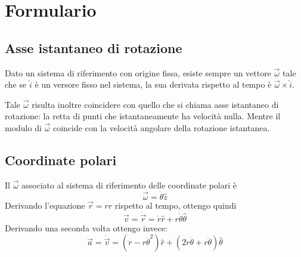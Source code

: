 \documentclass[../main.tex]{subfiles}
\begin{document}
\section{Formulario}
\setcounter{equation}{0}
\renewcommand{\theequation}{F.\arabic{equation}}

\subsection{Asse istantaneo di rotazione}\label{air}
Dato un sistema di riferimento con origine fissa, esiste sempre un vettore $\vec\omega$ tale che se $\hat i$ è un versore fisso nel sistema, la sua derivata rispetto al tempo è $\vec\omega\times\hat i$.

Tale $\vec\omega$ risulta inoltre coincidere con quello che si chiama asse istantaneo di rotazione: la retta di punti che istantaneamente ha velocità nulla. Mentre il modulo di $\vec\omega$ coincide con la velocità angolare della rotazione istantanea.

\subsection{Coordinate polari} 
Il $\vec\omega$ associato al sistema di riferimento delle coordinate polari è
\begin{equation}\label{OmegaPolari}
	\vec{\omega}=\dot{\theta}\hat{z}
\end{equation}
Derivando l'equazione $\vec{r}=r\hat{r}$ rispetto al tempo, ottengo quindi
\begin{equation}\label{VelCooPolari}
	\vec{v}=\dot{\vec{r}}=\dot{r}\hat{r}+r\dot{\theta}\hat{\theta}
\end{equation}
Derivando una seconda volta ottengo invece:
\begin{equation}\label{AccCooPolari}
	\vec{a}=\dot{\vec{v}} =(\ddot{r}-r\dot{\theta}^2)\hat{r}+(2\dot{r}\dot{\theta}+r\ddot{\theta})\hat{\theta}
\end{equation}
\end{document}
